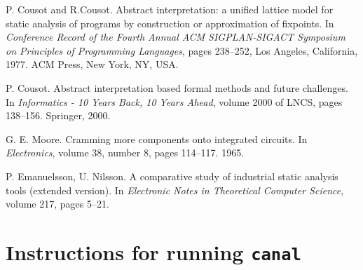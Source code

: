 \documentclass[12pt,final,oneside]{fithesis2}
\begin{document}
\begin{thebibliography}{99}

P{.} Cousot and R{.}Cousot.
\newblock Abstract interpretation: a unified lattice model for static
  analysis of programs by construction or approximation of fixpoints.
\newblock In \emph{Conference Record of the Fourth Annual ACM
  SIGPLAN-SIGACT Symposium on Principles of Programming Languages},
  pages 238--252, Los Angeles, California, 1977. ACM Press, New York,
  NY, USA.

P{.} Cousot.
\newblock Abstract interpretation based formal methods and future
  challenges.
\newblock In \emph{Informatics - 10 Years Back, 10 Years Ahead},
  volume 2000 of LNCS, pages 138--156. Springer, 2000.

G{.} E{.} Moore.
\newblock Cramming more components onto integrated circuits.
\newblock In \emph{Electronics}, volume 38, number 8, pages 114--117. 1965.

P{.} Emanuelsson, U{.} Nilsson.
\newblock A comparative study of industrial static analysis tools (extended
  version).
\newblock In \emph{Electronic Notes in Theoretical Computer Science},
  volume 217, pages 5--21.

\end{thebibliography}


\appendix

\chapter{Instructions for running \texttt{canal}}
\label{chap:instructions}

\end{document}
